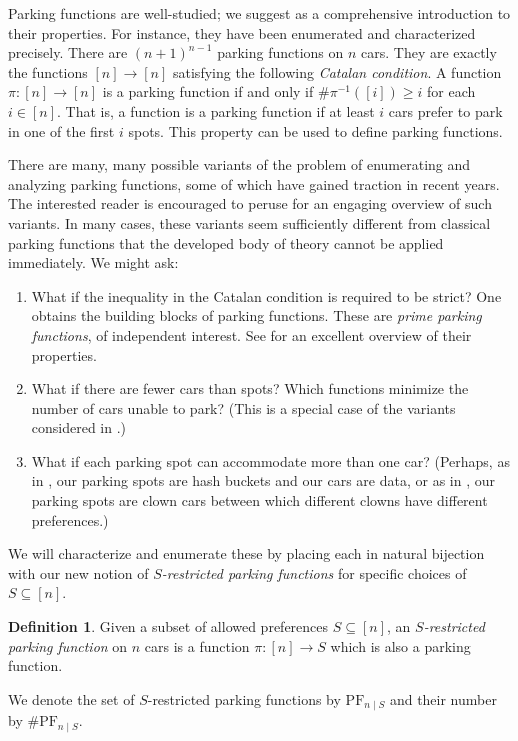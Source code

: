 \documentclass[12 pt]{amsart}
\theoremstyle{definition} %
\newtheorem{definition}[theorem]{Definition}
\theoremstyle{remark} %
\begin{document}
Parking functions are well-studied; we suggest \cite{yan-survey-2015} as a comprehensive introduction to their properties. For instance, they have been enumerated and characterized precisely. There are $(n + 1)^{n - 1}$ parking functions on $n$ cars. They are exactly the functions $[n] \to [n]$ satisfying the following \emph{Catalan condition}. A function $\pi : [n] \to [n]$ is a parking function if and only if $\#\pi^{-1}([i]) \ge i$ for each $i \in [n]$. That is, a function is a parking function if at least $i$ cars prefer to park in one of the first $i$ spots. This property can be used to define parking functions.

There are many, many possible variants of the problem of enumerating and analyzing parking functions, some of which have gained traction in recent years. The interested reader is encouraged to peruse \cite{carlson-harris-2020} for an engaging overview of such variants. In many cases, these variants seem sufficiently different from classical parking functions that the developed body of theory cannot be applied immediately. We might ask:
\begin{enumerate}
	\item What if the inequality in the Catalan condition is required to be strict? One obtains the building blocks of parking functions. These are \emph{prime parking functions}, of independent interest. See \cite{meyles-2023} for an excellent overview of their properties.
 	\item What if there are fewer cars than spots? Which functions minimize the number of cars unable to park? (This is a special case of the variants considered in \cite{cameron-johannsen-prellberg-schweitzer-2008}.)
	\item What if each parking spot can accommodate more than one car? (Perhaps, as in \cite{blake-konheim-1977}, our parking spots are hash buckets and our cars are data, or as in \cite{carlson-harris-2020}, our parking spots are clown cars between which different clowns have different preferences.)
\end{enumerate}
We will characterize and enumerate these by placing each in natural bijection with our new notion of \emph{$S$-restricted parking functions} for specific choices of $S \subseteq [n]$.

\begin{definition}
    Given a subset of allowed preferences $S \subseteq [n]$, an \emph{$S$-restricted parking function} on $n$ cars is a function $\pi : [n] \to S$ which is also a parking function. 

    We denote the set of $S$-restricted parking functions by $\mathrm{PF}_{n \mid S}$ and their number by $\# \mathrm{PF}_{n \mid S}$.
\end{definition}
\end{document}
